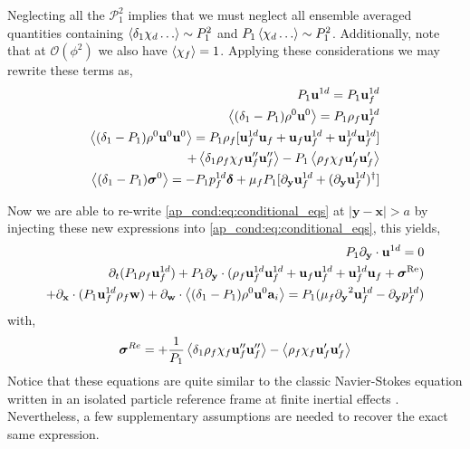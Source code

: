 Neglecting all the $\mathcal{P_1^2}$ implies that we must neglect all ensemble averaged quantities containing $\left<\delta_1 \chi_d \ldots\right>\sim P_1^2$ and $P_1 \left< \chi_d \ldots\right>\sim P_1^2$. 
Additionally, note that at $\mathcal{O}(\phi^2)$ we also have $\left<\chi_f\right> = 1$. 
Applying these considerations we may rewrite these terms as, 
\begin{align*}
    P_1 \textbf{u}^{1d}
    = P_1 \textbf{u}_f^{1d}\\
    \left<(\delta_1 - P_1)\rho^0\textbf{u}^0\right>
    = P_1\rho_f\textbf{u}^{1d}_f\\
    \left<(\delta_1 - P_1)\rho^0\textbf{u}^0\textbf{u}^0\right>
    =
    P_1\rho_f[
        \textbf{u}^{1d}_f\textbf{u}_f
        + \textbf{u}_f\textbf{u}_f^{1d}
        + \textbf{u}^{1d}_f\textbf{u}_f^{1d}
    ]\\
    + \left<\delta_1\rho_f\chi_f\textbf{u}_f''\textbf{u}_f''\right>
    - P_1 \left<\rho_f\chi_f\textbf{u}_f'\textbf{u}_f'\right>
    \\
    \left<(\delta_1 - P_1)\bm\sigma^0\right>
    = 
    - P_1 p_f^{1d} \bm\delta
    +\mu_fP_1[{\partial_\textbf{y}} \textbf{u}^{1d}_f + ({\partial_\textbf{y}}\textbf{u}^{1d}_f)^\dagger]
\end{align*}

Now we are able to re-write \ref{ap_cond:eq:conditional_eqs} at $|\textbf{y}-\textbf{x}| > a$ by injecting these new expressions into \ref{ap_cond:eq:conditional_eqs}, this yields,  
\begin{align}
    P_1 {\partial_\textbf{y}} \cdot \textbf{u}^{1d} = 0 \\
    \partial_t (P_1 \rho_f \textbf{u}_f^{1d})
    + P_1 {\partial_\textbf{y}}\cdot (
    \rho_f \textbf{u}^{1d}_f\textbf{u}_f^{1d} 
    + \textbf{u}_f\textbf{u}_f^{1d}
    + \textbf{u}^{1d}_f\textbf{u}_f
    + \bm\sigma^\text{Re})\nonumber\\
    + {\partial_\textbf{x}}\cdot (P_1 \textbf{u}_f^{1d}\rho_f\textbf{w}) 
    + {\partial_\textbf{w}}\cdot \left<(\delta_1 - P_1)\rho^0\textbf{u}^0\textbf{a}_i\right>
    = P_1 (
        \mu_f {\partial_\textbf{y}}^2 \textbf{u}^{1d}_f  
        - {\partial_\textbf{y}} p_f^{1d} 
    )
\end{align}
with, 
\begin{equation*}
    \bm\sigma^{Re}
    = 
    + \frac{1}{P_1}\left<\delta_1\rho_f\chi_f\textbf{u}_f''\textbf{u}_f''\right>
    - \left<\rho_f\chi_f\textbf{u}_f'\textbf{u}_f'\right>
\end{equation*}
Notice that these equations are quite similar to the classic Navier-Stokes equation written in an isolated particle reference frame at finite inertial effects \citep{maxey1983equation}. 
Nevertheless, a few supplementary assumptions are needed to recover the exact same expression. 

